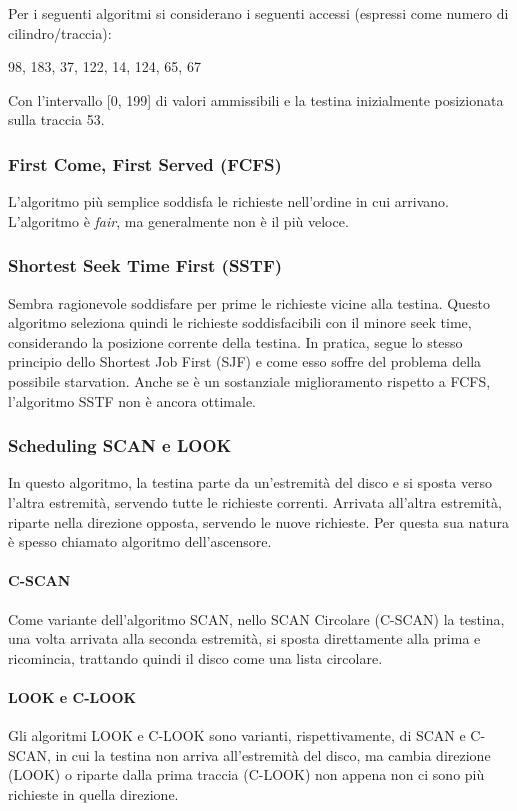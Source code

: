 \documentclass[a4paper]{article}
\begin{document}
Per i seguenti algoritmi si considerano i seguenti accessi (espressi come numero di cilindro/traccia): \newline
\centerline{98, 183, 37, 122, 14, 124, 65, 67}
\newline
Con l'intervallo [0, 199] di valori ammissibili e la testina inizialmente posizionata sulla traccia 53.

\subsubsection{First Come, First Served (FCFS)}
L'algoritmo più semplice soddisfa le richieste nell'ordine in cui arrivano. L'algoritmo è \textit{fair}, ma generalmente non è il più veloce.

\subsubsection{Shortest Seek Time First (SSTF)}
Sembra ragionevole soddisfare per prime le richieste vicine alla testina. Questo algoritmo seleziona quindi le richieste soddisfacibili con il minore seek time, considerando la posizione corrente della testina. In pratica, segue lo stesso principio dello Shortest Job First (SJF) e come esso soffre del problema della possibile starvation. Anche se è un sostanziale miglioramento rispetto a FCFS, l'algoritmo SSTF non è ancora ottimale.

\subsubsection{Scheduling SCAN e LOOK}
In questo algoritmo, la testina parte da un'estremità del disco e si sposta verso l'altra estremità, servendo tutte le richieste correnti. Arrivata all'altra estremità, riparte nella direzione opposta, servendo le nuove richieste. Per questa sua natura è spesso chiamato algoritmo dell'ascensore.

\paragraph{C-SCAN} Come variante dell'algoritmo SCAN, nello SCAN Circolare (C-SCAN) la testina, una volta arrivata alla seconda estremità, si sposta direttamente alla prima e ricomincia, trattando quindi il disco come una lista circolare.

\paragraph{LOOK e C-LOOK} Gli algoritmi LOOK e C-LOOK sono varianti, rispettivamente, di SCAN e C-SCAN, in cui la testina non arriva all'estremità del disco, ma cambia direzione (LOOK) o riparte dalla prima traccia (C-LOOK) non appena non ci sono più richieste in quella direzione.
\newline
\end{document}
